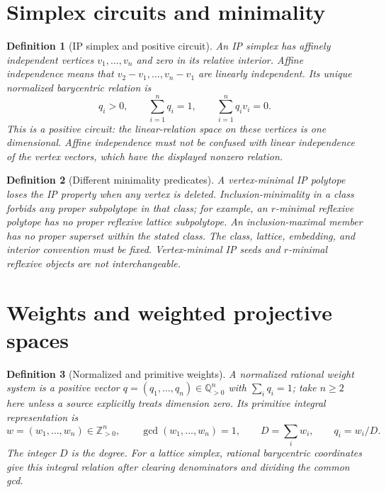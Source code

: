 \documentclass[11pt,a4paper,oneside]{report}
\newtheorem{definition}{Definition}[chapter]
\begin{document}
\section{Simplex circuits and minimality}

\begin{definition}[IP simplex and positive circuit]
An IP simplex has affinely independent vertices \(v_1,\ldots,v_n\) and
zero in its relative interior. Affine independence means that
\(v_2-v_1,\ldots,v_n-v_1\) are linearly independent.
Its unique normalized barycentric relation is
\[
  q_i>0,\qquad \sum_{i=1}^{n}q_i=1,\qquad
  \sum_{i=1}^{n}q_i v_i=0.
\]
This is a positive circuit: the linear-relation space on these vertices is
one dimensional. Affine independence must not be confused with linear
independence of the vertex vectors, which have the displayed nonzero relation.
\end{definition}

\begin{definition}[Different minimality predicates]
A vertex-minimal IP polytope loses the IP property when any vertex is
deleted. Inclusion-minimality in a class forbids any proper subpolytope in
that class; for example, an \(r\)-minimal reflexive polytope has no proper
reflexive lattice subpolytope. An inclusion-maximal member has no proper
superset within the stated class. The class, lattice, embedding, and interior
convention must be fixed. Vertex-minimal IP seeds and \(r\)-minimal reflexive
objects are not interchangeable.
\end{definition}

\section{Weights and weighted projective spaces}

\begin{definition}[Normalized and primitive weights]
A normalized rational weight system is a positive vector
\(q=(q_1,\ldots,q_n)\in\mathbb{Q}_{>0}^{n}\) with \(\sum_i q_i=1\);
take \(n\geq2\) here unless a source explicitly treats dimension zero.
Its primitive integral representation is
\[
  w=(w_1,\ldots,w_n)\in\mathbb{Z}_{>0}^{n},\qquad
  \gcd(w_1,\ldots,w_n)=1,\qquad
  D=\sum_i w_i,\qquad q_i=w_i/D.
\]
The integer \(D\) is the degree. For a lattice simplex, rational barycentric
coordinates give this integral relation after clearing denominators and
dividing the common gcd.
\end{definition}
\end{document}
